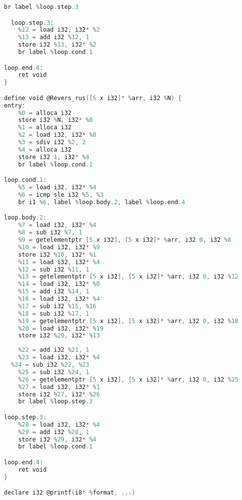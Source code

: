 \newpage
\setcounter{lstlisting}{4}
\begin{lstlisting}[language=go, firstnumber=last, caption={Пример промежуточного представления LLVM IR для разворота массива}]
	br label %loop.step.3

  loop.step.3:
	%12 = load i32, i32* %2
	%13 = add i32 %12, 1
	store i32 %13, i32* %2
	br label %loop.cond.1

loop.end.4:
	ret void
}

define void @Revers_rus([5 x i32]* %arr, i32 %N) {
entry:
	%0 = alloca i32
	store i32 %N, i32* %0
	%1 = alloca i32
	%2 = load i32, i32* %0
	%3 = sdiv i32 %2, 2
	%4 = alloca i32
	store i32 1, i32* %4
	br label %loop.cond.1

loop.cond.1:
	%5 = load i32, i32* %4
	%6 = icmp sle i32 %5, %3
	br i1 %6, label %loop.body.2, label %loop.end.4

loop.body.2:
	%7 = load i32, i32* %4
	%8 = sub i32 %7, 1
	%9 = getelementptr [5 x i32], [5 x i32]* %arr, i32 0, i32 %8
	%10 = load i32, i32* %9
	store i32 %10, i32* %1
	%11 = load i32, i32* %4
	%12 = sub i32 %11, 1
	%13 = getelementptr [5 x i32], [5 x i32]* %arr, i32 0, i32 %12
	%14 = load i32, i32* %0
	%15 = add i32 %14, 1
	%16 = load i32, i32* %4
	%17 = sub i32 %15, %16
	%18 = sub i32 %17, 1
	%19 = getelementptr [5 x i32], [5 x i32]* %arr, i32 0, i32 %18
	%20 = load i32, i32* %19
	store i32 %20, i32* %13
\end{lstlisting}

\newpage
\setcounter{lstlisting}{4}
\begin{lstlisting}[language=go, firstnumber=last, caption={Пример промежуточного представления LLVM IR для разворота массива}]
	%21 = load i32, i32* %0
	%22 = add i32 %21, 1
	%23 = load i32, i32* %4
  %24 = sub i32 %22, %23
	%25 = sub i32 %24, 1
	%26 = getelementptr [5 x i32], [5 x i32]* %arr, i32 0, i32 %25
	%27 = load i32, i32* %1
	store i32 %27, i32* %26
	br label %loop.step.3

loop.step.3:
	%28 = load i32, i32* %4
	%29 = add i32 %28, 1
	store i32 %29, i32* %4
	br label %loop.cond.1

loop.end.4:
	ret void
}

declare i32 @printf(i8* %format, ...)
\end{lstlisting}

\newpage